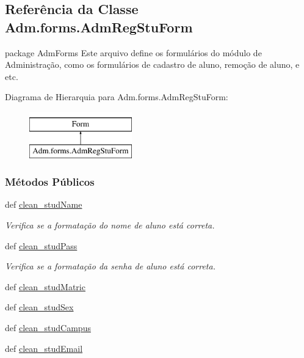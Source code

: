 \hypertarget{classAdm_1_1forms_1_1AdmRegStuForm}{\subsection{Referência da Classe Adm.\-forms.\-Adm\-Reg\-Stu\-Form}
\label{classAdm_1_1forms_1_1AdmRegStuForm}
}


package Adm\-Forms Este arquivo define os formulários do módulo de Administração, como os formulários de cadastro de aluno, remoção de aluno, e etc.  


Diagrama de Hierarquia para Adm.\-forms.\-Adm\-Reg\-Stu\-Form\-:\begin{figure}[H]
\begin{center}
\leavevmode
\includegraphics[height=2.000000cm]{d0/d94/classAdm_1_1forms_1_1AdmRegStuForm}
\end{center}
\end{figure}
\subsubsection*{Métodos Públicos}
\begin{DoxyCompactItemize}
\item 
def \hyperlink{classAdm_1_1forms_1_1AdmRegStuForm_acf7d90895b102b79c853f83ac62d301b}{clean\-\_\-stud\-Name}
\begin{DoxyCompactList}\small\item\em Verifica se a formatação do nome de aluno está correta. \end{DoxyCompactList}\item 
def \hyperlink{classAdm_1_1forms_1_1AdmRegStuForm_a02518090b354e902fa6ed4d23ec4c0bf}{clean\-\_\-stud\-Pass}
\begin{DoxyCompactList}\small\item\em Verifica se a formatação da senha de aluno está correta. \end{DoxyCompactList}\item 
def \hyperlink{classAdm_1_1forms_1_1AdmRegStuForm_a278640fd2d8b3e9bc885520ee8ea47a8}{clean\-\_\-stud\-Matric}
\item 
def \hyperlink{classAdm_1_1forms_1_1AdmRegStuForm_aafae355caee4bf30ee8dad11e9feb4a7}{clean\-\_\-stud\-Sex}
\item 
def \hyperlink{classAdm_1_1forms_1_1AdmRegStuForm_a01013957e80d5d9e306861c3688503e1}{clean\-\_\-stud\-Campus}
\item 
def \hyperlink{classAdm_1_1forms_1_1AdmRegStuForm_a8f3b0dc4771aa8746b683a7062700cfc}{clean\-\_\-stud\-Email}
\end{DoxyCompactItemize}
